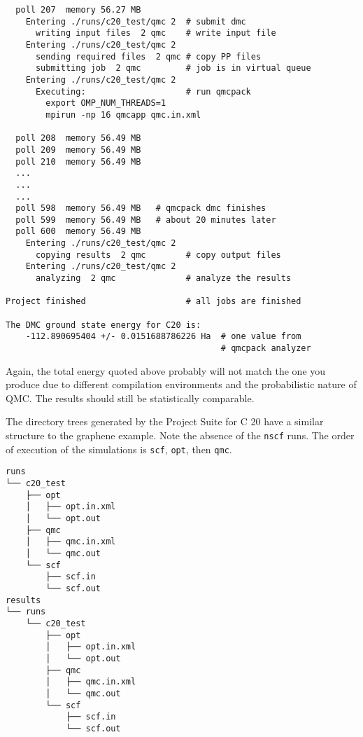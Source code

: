 \documentclass[oneside,11pt]{memoir}
\numberwithin{equation}{section}
\begin{document}
\begin{shaded}
\begin{verbatim}
  poll 207  memory 56.27 MB 
    Entering ./runs/c20_test/qmc 2  # submit dmc
      writing input files  2 qmc    # write input file
    Entering ./runs/c20_test/qmc 2 
      sending required files  2 qmc # copy PP files
      submitting job  2 qmc         # job is in virtual queue
    Entering ./runs/c20_test/qmc 2 
      Executing:                    # run qmcpack
        export OMP_NUM_THREADS=1
        mpirun -np 16 qmcapp qmc.in.xml 

  poll 208  memory 56.49 MB 
  poll 209  memory 56.49 MB 
  poll 210  memory 56.49 MB 
  ...
  ...
  ...
  poll 598  memory 56.49 MB   # qmcpack dmc finishes
  poll 599  memory 56.49 MB   # about 20 minutes later
  poll 600  memory 56.49 MB 
    Entering ./runs/c20_test/qmc 2 
      copying results  2 qmc        # copy output files
    Entering ./runs/c20_test/qmc 2 
      analyzing  2 qmc              # analyze the results

Project finished                    # all jobs are finished
 
The DMC ground state energy for C20 is:
    -112.890695404 +/- 0.0151688786226 Ha  # one value from
                                           # qmcpack analyzer
\end{verbatim}
\end{shaded}

Again, the total energy quoted above probably will not match the one you produce 
due to different compilation environments and the probabilistic nature of 
QMC.  The results should still be statistically comparable.

The directory trees generated by the Project Suite for C 20 have a similar structure 
to the graphene example.  Note the absence of the \texttt{nscf} runs.  The order 
of execution of the simulations is \texttt{scf}, \texttt{opt}, then \texttt{qmc}.

\begin{shaded}
\begin{verbatim}
runs
└── c20_test
    ├── opt
    │   ├── opt.in.xml
    │   └── opt.out
    ├── qmc
    │   ├── qmc.in.xml
    │   └── qmc.out
    └── scf
        ├── scf.in
        └── scf.out
results
└── runs
    └── c20_test
        ├── opt
        │   ├── opt.in.xml
        │   └── opt.out
        ├── qmc
        │   ├── qmc.in.xml
        │   └── qmc.out
        └── scf
            ├── scf.in
            └── scf.out
\end{verbatim}
\end{shaded}
\end{document}
